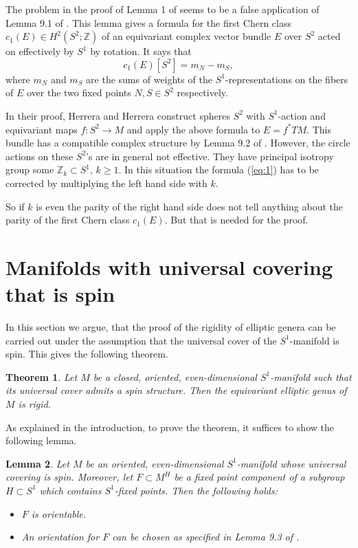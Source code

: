 \documentclass[a4paper, 11pt]{amsart}
\newtheorem{theorem}{Theorem}[section]
\newtheorem{lemma}[theorem]{Lemma}
\theoremstyle{definition}
\theoremstyle{remark}
\numberwithin{equation}{section}
\begin{document}
The problem in the proof of Lemma 1 of \cite{MR1979364} seems to be a false application of Lemma 9.1 of \cite{MR954493}.
This lemma gives a formula for the first Chern class \(c_1(E)\in H^2(S^2;\mathbb{Z})\) of an equivariant complex vector bundle \(E\) over \(S^2\) acted on effectively by \(S^1\) by rotation.
It says that
\begin{equation}
  \label{eq:1}
  c_1(E)[S^2]=m_N-m_S,
\end{equation}
where \(m_N\) and \(m_S\) are the sums of weights of the \(S^1\)-representations on the fibers of \(E\) over the two fixed points \(N,S\in S^2\) respectively.

In their proof, Herrera and Herrera construct spheres \(S^2\) with \(S^1\)-action and equivariant maps \(f:S^2\rightarrow M\) and apply the above formula to \(E=f^*TM\).
This bundle has a compatible complex structure by Lemma 9.2 of \cite{MR954493}.
However, the circle actions on these \(S^2\)'s are in general not effective.
They have principal isotropy group some \(\mathbb{Z}_k\subset S^1\), \(k\geq 1\).
In this situation the formula (\ref{eq:1}) has to be corrected by multiplying the left hand side with \(k\).

So if \(k\) is even the parity of the right hand side does not tell anything about the parity of the first Chern class \(c_1(E)\). But that is needed for the proof.



\section{Manifolds with universal covering that is spin}
\label{sec:solution-problem}


In this section we argue, that the proof of the rigidity of elliptic genera can be carried out under the assumption that the universal cover of the \(S^1\)-manifold is spin.
This gives the following theorem.
\begin{theorem}
  \label{sec:manif-with-univ-1}
  Let \(M\) be a closed, oriented, even-dimensional \(S^1\)-manifold such that its universal cover admits a spin structure. Then the equivariant elliptic genus of \(M\) is rigid.
\end{theorem}




As explained in the introduction, to prove the theorem, it suffices to show the following lemma.


\begin{lemma}
  \label{sec:manif-with-univ-3}
  Let \(M\) be an oriented, even-dimensional \(S^1\)-manifold whose universal covering is spin. Moreover, let \(F\subset M^H\) be a fixed point component of a subgroup \(H\subset S^1\) which contains \(S^1\)-fixed points.
  Then the following holds:
  \begin{itemize}
  \item \(F\) is orientable.
  \item  An orientation for \(F\) can be chosen as specified in Lemma 9.3 of \cite{MR954493}.
  \end{itemize}
\end{lemma}
\end{document}

